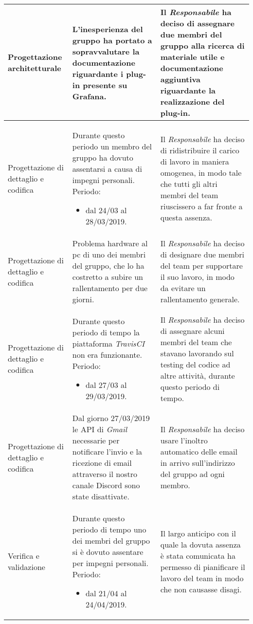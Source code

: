 \begin{longtable}{| L{7em} | L{15em} | L{16em} |}
Progettazione architetturale & L'inesperienza del gruppo ha portato a sopravvalutare la documentazione riguardante i plug-in presente su Grafana. & Il \emph{Responsabile} ha deciso di assegnare due membri del gruppo alla ricerca di materiale utile e documentazione aggiuntiva riguardante la realizzazione del plug-in. \\
\hline

Progettazione di dettaglio e codifica & Durante questo periodo un membro del gruppo ha dovuto assentarsi a causa di impegni personali. Periodo:\begin{itemize}
	\item dal 24/03 al 28/03/2019.
\end{itemize} & Il \emph{Responsabile} ha deciso di ridistribuire il carico di lavoro in maniera omogenea, in modo tale che tutti gli altri membri del team riuscissero a far fronte a questa assenza. \\
\hline

Progettazione di dettaglio e codifica & Problema hardware al pc di uno dei membri del gruppo, che lo ha costretto a subire un rallentamento per due giorni. & Il \emph{Responsabile} ha deciso di designare due membri del team per supportare il suo lavoro, in modo da evitare un rallentamento generale. \\
\hline

Progettazione di dettaglio e codifica & Durante questo periodo di tempo la piattaforma \emph{TravisCI} non era funzionante. Periodo:\begin{itemize}
	\item dal 27/03 al 29/03/2019.
\end{itemize} & Il \emph{Responsabile} ha deciso di assegnare alcuni membri del team che stavano lavorando sul testing del codice ad altre attività, durante questo periodo di tempo. \\
\hline

Progettazione di dettaglio e codifica & Dal giorno 27/03/2019 le API di \emph{Gmail} necessarie per notificare l'invio e la ricezione di email attraverso il nostro canale Discord sono state disattivate. & Il \emph{Responsabile} ha deciso usare l'inoltro automatico delle email in arrivo sull'indirizzo del gruppo ad ogni membro. \\
\hline

Verifica e validazione & Durante questo periodo di tempo uno dei membri del gruppo si è dovuto assentare per impegni personali. Periodo:\begin{itemize}
	\item dal 21/04 al 24/04/2019.
\end{itemize} & Il largo anticipo con il quale la dovuta assenza è stata comunicata ha permesso di pianificare il lavoro del team in modo che non causasse disagi.\\
\hline


\end{longtable}
